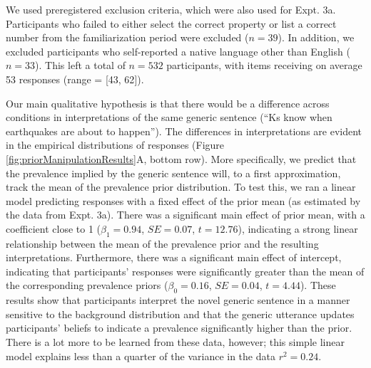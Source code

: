 \documentclass[floatsintext,man]{apa6}
\theoremstyle{definition}
\theoremstyle{definition}
\theoremstyle{definition}
\theoremstyle{remark}
\begin{document}
We used preregistered exclusion criteria, which were also used for Expt.
3a. Participants who failed to either select the correct property or
list a correct number from the familiarization period were excluded
(\(n = 39\)). In addition, we excluded participants who self-reported a
native language other than English (\(n = 33\)). This left a total of
\(n = 532\) participants, with items receiving on average 53 responses
(range = {[}43, 62{]}).

Our main qualitative hypothesis is that there would be a difference
across conditions in interpretations of the same generic sentence
(\enquote{Ks know when earthquakes are about to happen}). The
differences in interpretations are evident in the empirical
distributions of responses (Figure \ref{fig:priorManipulationResults}A,
bottom row). More specifically, we predict that the prevalence implied
by the generic sentence will, to a first approximation, track the mean
of the prevalence prior distribution. To test this, we ran a linear
model predicting responses with a fixed effect of the prior mean (as
estimated by the data from Expt. 3a). There was a significant main
effect of prior mean, with a coefficient close to 1 (\(\beta_1 = 0.94\),
\(SE=0.07\), \(t = 12.76\)), indicating a strong linear relationship
between the mean of the prevalence prior and the resulting
interpretations. Furthermore, there was a significant main effect of
intercept, indicating that participants' responses were significantly
greater than the mean of the corresponding prevalence priors
(\(\beta_0 = 0.16\), \(SE=0.04\), \(t = 4.44\)). These results show that
participants interpret the novel generic sentence in a manner sensitive
to the background distribution and that the generic utterance updates
participants' beliefs to indicate a prevalence significantly higher than
the prior. There is a lot more to be learned from these data, however;
this simple linear model explains less than a quarter of the variance in
the data \(r^2 = 0.24\).
\end{document}
